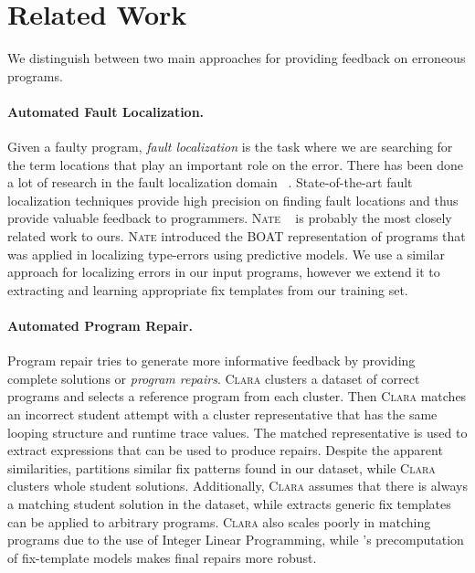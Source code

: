 \section{Related Work}
\label{sec:related-work}
We distinguish between two main approaches for providing feedback on erroneous
programs.

\paragraph{Automated Fault Localization.} Given a faulty program, 
\emph{fault localization} is the task where we are searching for 
the term locations that play an important role on the error. 
%
There has been done a lot of research in the fault localization domain
~\citep{Seidel:2017,Wand1986-nw,Haack2003-vc,Tip2001-qp}. State-of-the-art fault
localization techniques provide high precision on finding fault locations and
thus provide valuable feedback to programmers. \textsc{Nate}
~\citep{Seidel:2017} is probably the most closely related work to ours.
\textsc{Nate} introduced the BOAT representation of programs that was applied in
localizing type-errors using predictive models. We use a similar approach for
localizing errors in our input programs, however we extend it to extracting and
learning appropriate fix templates from our training set.

\paragraph{Automated Program Repair.} Program repair tries to generate more
informative feedback by providing complete solutions or \emph{program repairs}.
\textsc{Clara} \citep{Gulwani_2018} clusters a dataset of correct programs and
selects a reference program from each cluster. Then \textsc{Clara} matches an
incorrect student attempt with a cluster representative that has the same
looping structure and runtime trace values. The matched representative is used
to extract expressions that can be used to produce repairs. Despite the apparent
similarities, \toolname partitions similar fix patterns found in our dataset,
while \textsc{Clara} clusters whole student solutions. Additionally,
\textsc{Clara} assumes that there is always a matching student solution in the
dataset, while \toolname extracts generic fix templates can be applied to
arbitrary programs. \textsc{Clara} also scales poorly in matching programs due
to the use of Integer Linear Programming, while \toolname's precomputation of
fix-template models makes final repairs more robust.

